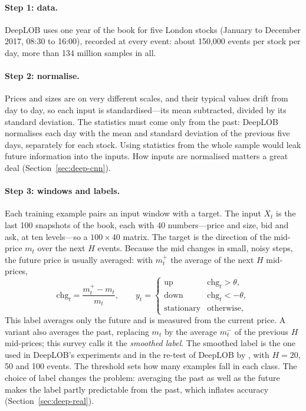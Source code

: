 \paragraph{Step 1: data.} DeepLOB uses one year of the book for five London stocks (January to December 2017,
08:30 to 16:00), recorded at every event: about 150,000 events per stock per day, more than 134 million samples in
all.

\paragraph{Step 2: normalise.} Prices and sizes are on very different scales, and their typical values drift from
day to day, so each input is standardised---its mean subtracted, divided by its standard deviation. The statistics
must come only from the past: DeepLOB normalises each day with the mean and standard deviation of the previous five
days, separately for each stock. Using statistics from the whole sample would leak future information into the
inputs. How inputs are normalised matters a great deal (Section~\ref{sec:deep-cnn}).

\paragraph{Step 3: windows and labels.} Each training example pairs an input window with a target. The input $X_t$ is
the last 100 snapshots of the book, each with 40 numbers---price and size, bid and ask, at ten levels---so a $100
\times 40$ matrix. The target is the direction of the mid-price $m_t$ over the next $H$ events. Because the mid
changes in small, noisy steps, the future price is usually averaged: with $m^+_t$ the average of the next $H$
mid-prices,
\begin{equation}
\mathrm{chg}_t = \frac{m^+_t - m_t}{m_t},
\qquad
y_t = \begin{cases} \text{up} & \mathrm{chg}_t > \theta,\\ \text{down} & \mathrm{chg}_t < -\theta,\\ \text{stationary} & \text{otherwise,}\end{cases}
\label{eq:deep-label}
\end{equation}
 This label averages only the future and
is measured from the current price. A variant also averages the past, replacing $m_t$ by the average $m^-_t$ of the
previous $H$ mid-prices; this survey calls it the \emph{smoothed label}. The smoothed label is the one used in
DeepLOB's experiments and in the re-test of DeepLOB by \citet{lee2024predictability}, with $H = 20$, 50 and 100
events. The threshold sets how many examples fall in each class. The choice of label changes the problem: averaging the past as well as the future
makes the label partly predictable from the past, which inflates accuracy~\citep{lee2024predictability}
(Section~\ref{sec:deep-real}).

